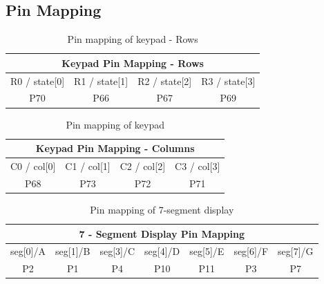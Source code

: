 \documentclass[11pt]{article}
\begin{document}
\clearpage

\subsection{Pin Mapping}

\begin{table}[h]
\centering
\begin{tabular}{|c|c|c|c|}
\hline
\multicolumn{4}{|c|}{\textbf{Keypad Pin Mapping - Rows}}                                                                                                     \\ \hline
R0 / state{[}0{]} & R1 / state{[}1{]} & R2 / state{[}2{]} & R3 / state{[}3{]} \\ \hline
P70               & P66               & P67               & P69               \\ \hline
\end{tabular}
\caption{Pin mapping of keypad - Rows}
\label{table:pinmap_keypad_row}
\end{table}


\begin{table}[h]
\centering
\begin{tabular}{|c|c|c|c|}
\hline
\multicolumn{4}{|c|}{\textbf{Keypad Pin Mapping - Columns}}                                                                                                     \\ \hline
C0 / col{[}0{]} & C1 / col{[}1{]} & C2 / col{[}2{]} & C3 / col{[}3{]} \\ \hline
P68             & P73             & P72             & P71             \\ \hline
\end{tabular}
\caption{Pin mapping of keypad}
\label{table:pinmap_keypad_col}
\end{table}


\begin{table}[h]
\centering
\begin{tabular}{|c|c|c|c|c|c|c|}
\hline
\multicolumn{7}{|c|}{\textbf{7 - Segment Display Pin Mapping}} \\ \hline
seg[0]/A   & seg[1]/B   & seg[3]/C   & seg[4]/D    & seg[5]/E    & seg[6]/F   & seg[7]/G   \\ \hline
P2         & P1         & P4         & P10         & P11         & P3         & P7  \\ \hline
\end{tabular}
\caption{Pin mapping of 7-segment display}
\label{table:pinmap_sevenseg}
\end{table}
\end{document}
